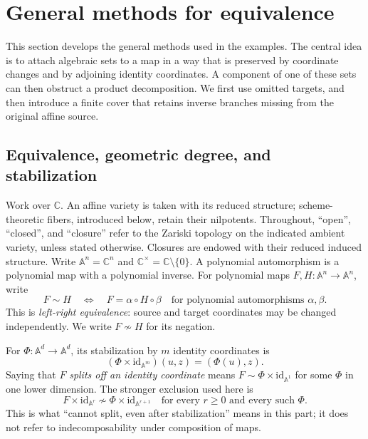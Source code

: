 \documentclass[11pt]{article}
\numberwithin{equation}{section}
\theoremstyle{plain}
\theoremstyle{definition}
\theoremstyle{remark}
\newcommand{\C}{\mathbb{C}}
\newcommand{\A}{\mathbb{A}}
\newcommand{\id}{\mathrm{id}}
\begin{document}
\section{General methods for equivalence}\label{prod:sec:theory}
This section develops the general methods used in the examples. The central
idea is to attach algebraic sets to a map in a way that is preserved by
coordinate changes and by adjoining identity coordinates. A component of
one of these sets can then obstruct a product decomposition. We first use
omitted targets, and then introduce a finite cover that retains inverse
branches missing from the original affine source.

\subsection{Equivalence, geometric degree, and stabilization}
Work over $\C$. An affine variety is taken with its reduced structure;
scheme-theoretic fibers, introduced below, retain their nilpotents.
Throughout, ``open'', ``closed'', and ``closure'' refer to the Zariski
topology on the indicated ambient variety, unless stated otherwise.
Closures are endowed with their reduced induced structure.
Write $\A^n=\C^n$ and $\C^\times=\C\setminus\{0\}$.
A polynomial automorphism is a polynomial map with a polynomial inverse.
For polynomial maps $F,H:\A^n\to\A^n$, write
\[
 F\sim H\quad\Longleftrightarrow\quad
 F=\alpha\circ H\circ\beta
 \quad\text{for polynomial automorphisms }\alpha,\beta.
\]
This is \emph{left-right equivalence}: source and target coordinates may
be changed independently. We write $F\nsim H$ for its negation.

For $\Phi:\A^d\to\A^d$, its stabilization by $m$ identity coordinates is
\[
 (\Phi\times\id_{\A^m})(u,z)=(\Phi(u),z).
\]
Saying that $F$ \emph{splits off an identity coordinate} means
$F\sim\Phi\times\id_{\A^1}$ for some $\Phi$ in one lower dimension.
The stronger exclusion used here is
\begin{equation}\label{prod:eq:stable-exclusion}
 F\times\id_{\A^r}\nsim\Phi\times\id_{\A^{r+1}}
 \quad\text{for every }r\geq0\text{ and every such }\Phi.
\end{equation}
This is what ``cannot split, even after stabilization'' means in this part;
it does not refer to indecomposability under composition of maps.
\end{document}
